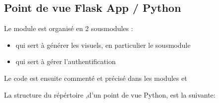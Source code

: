 \documentclass[letterpaper,10pt,french]{sphinxmanual}
\begin{document}
\subsection{Point de vue Flask App / Python}
\label{\detokenize{infrastructure:point-de-vue-flask-app-python}}
\sphinxAtStartPar
Le module  est organisé en 2 sous\sphinxhyphen{}modules :
\begin{itemize}
\item {} 
\sphinxAtStartPar
{} qui sert à générer les visuels, en particulier le sous\sphinxhyphen{}module 

\item {} 
\sphinxAtStartPar
{} qui sert à gérer l’authentification

\end{itemize}

\sphinxAtStartPar
Le code est ensuite commenté et précisé dans les modules {\hyperref[\detokenize{modules:agri}]{}} et {\hyperref[\detokenize{app:app}]{}}

\sphinxAtStartPar
La structure du répértoire ,d’un point de vue Python, est la suivante:
\end{document}
